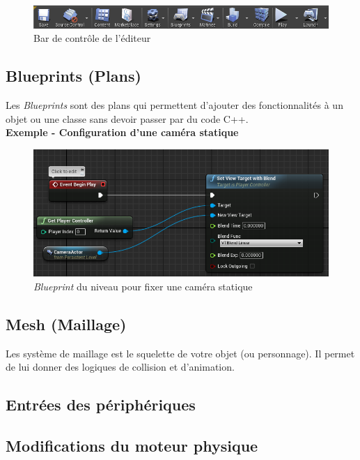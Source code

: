\documentclass[11pt, a4paper, oneside]{article}
\begin{document}
\begin{center}
\begin{figure}[htp]
\includegraphics[scale=.8]{bardecontrole}
\caption{Bar de contrôle de l'éditeur}
\end{figure}
\end{center}

\subsection{Blueprints (Plans)}
Les \emph{Blueprints} sont des plans qui permettent d'ajouter des fonctionnalités à un objet ou une classe sans devoir passer par du code C++.\\[.4cm]
\textbf{Exemple - Configuration d'une caméra statique}
\begin{center}
\begin{figure}[htp]
\includegraphics[scale=.8]{blueprint}
\caption{\emph{Blueprint} du niveau pour fixer une caméra statique}
\end{figure}
\end{center}

\subsection{Mesh (Maillage)}
Les système de maillage est le squelette de votre objet (ou personnage). Il permet de lui donner des logiques de collision et d'animation.

\subsection{Entrées des périphériques}

\subsection{Modifications du moteur physique}
\end{document}
